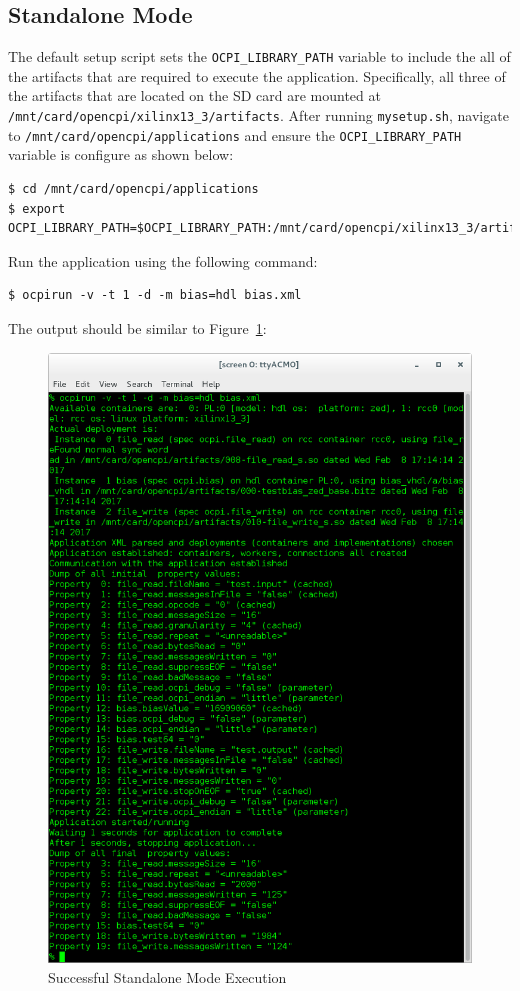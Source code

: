 \newpage
\subsection{Standalone Mode}
\begin{flushleft}
The default setup script sets the \texttt{OCPI\_LIBRARY\_PATH} variable to include the all of the artifacts that are required to execute the application. Specifically, all three of the artifacts that are located on the SD card are mounted at \texttt{/mnt/card/opencpi/xilinx13\_3/artifacts}.  After running \texttt{mysetup.sh}, navigate to \texttt{/mnt/card/opencpi/applications} and ensure the \texttt{OCPI\_LIBRARY\_PATH} variable is configure as shown below:
\begin{verbatim}
$ cd /mnt/card/opencpi/applications
$ export OCPI_LIBRARY_PATH=$OCPI_LIBRARY_PATH:/mnt/card/opencpi/xilinx13_3/artifacts
\end{verbatim}

Run the application using the following command:
\begin{verbatim}
$ ocpirun -v -t 1 -d -m bias=hdl bias.xml
\end{verbatim}
The output should be similar to Figure~\ref{fig:standBias}:
\end{flushleft}
\begin{figure}[H]
	\centerline{\includegraphics[scale=0.5]{zed_bias}}
	\caption{Successful Standalone Mode Execution}
 \label{fig:standBias}
\end{figure}

